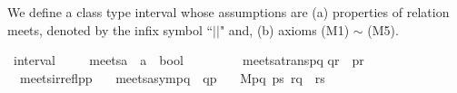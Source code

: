 \documentclass{llncs}
\begin{document}
We define a class type interval whose assumptions are (a) properties of relation meets, denoted by the infix symbol ``$||$" and, (b) axioms (M1) $\sim$ (M5). %
\begin{isabellebody}
\small\isanewline
{}\isamarkupfalse%
\ interval\ {\isacharequal}\isanewline
\ \isanewline
\ \ meets{\isacharcolon}{\isacharcolon}{\isachardoublequoteopen}{\isacharprime}a\ {\isasymRightarrow}\ {\isacharprime}a\ {\isasymRightarrow}\ bool{\isachardoublequoteclose}\ \ {\isacharparenleft}\ {\isachardoublequoteopen}{\isasymparallel}{\isachardoublequoteclose}\ {}{}{\isacharparenright}\ \isanewline
\ \isanewline
\ \ meets{\isacharunderscore}atrans{\isacharcolon}{\isachardoublequoteopen}{\isasymlbrakk}p{\isasymparallel}q {\isacharsemicolon}  q{\isasymparallel}r{\isasymrbrakk}\ {\isasymLongrightarrow}\ {\isasymnot}{\isacharparenleft}p{\isasymparallel}r{\isacharparenright}{\isachardoublequoteclose}\ \isanewline
\ \ meets{\isacharunderscore}irrefl{\isacharcolon}{\isachardoublequoteopen}{\isasymnot}{\isacharparenleft}p{\isasymparallel}p{\isacharparenright}{\isachardoublequoteclose}\ \isanewline
\ \ meets{\isacharunderscore}asym{\isacharcolon}{\isachardoublequoteopen}p{\isasymparallel}q\ {\isasymLongrightarrow}\ {\isasymnot}{\isacharparenleft}q{\isasymparallel}p{\isacharparenright}{\isachardoublequoteclose}\ \isanewline
\ \ M{}{\isacharcolon}{\isachardoublequoteopen}{\isasymlbrakk}p{\isasymparallel}q{\isacharsemicolon}\ p{\isasymparallel}s{\isacharsemicolon}\ r{\isasymparallel}q{\isasymrbrakk}\ {\isasymLongrightarrow}\ {\isacharparenleft}r{\isasymparallel}s{\isacharparenright}{\isachardoublequoteclose}\ \isanewline

\end{isabellebody}
\end{document}
